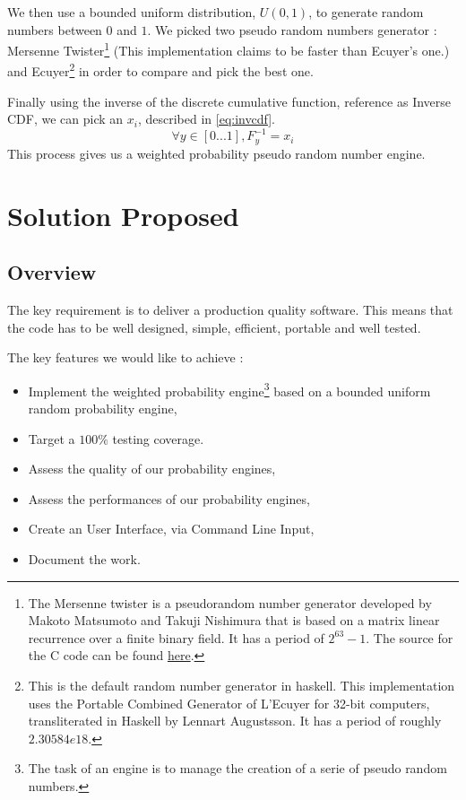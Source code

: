 \documentclass[12pt,a4paper,article]{memoir} %
\begin{document}
We then use a bounded uniform distribution, $U\left(0,1\right)$,
to generate random numbers between $0$ and $1$.
We picked two pseudo random numbers generator : Mersenne Twister\footnote{
The Mersenne twister is a pseudorandom number generator developed by 
Makoto Matsumoto and Takuji Nishimura that is based on a matrix linear 
recurrence over a finite binary field. 
It has a period of $2^{63}-1$.
The source for the C code can be found 
\href{http://www.math.sci.hiroshima-u.ac.jp/~m-mat/MT/emt64.html}{here}.
} (This implementation claims to be faster than Ecuyer's one.) and Ecuyer\footnote{
This is the default random number generator in haskell.
 This implementation uses the Portable Combined Generator of L'Ecuyer
 for 32-bit computers, transliterated in Haskell by Lennart Augustsson. 
 It has a period of roughly $2.30584e18$.
 } in order to compare and pick the best one.

Finally using the inverse of the discrete cumulative function, reference as Inverse CDF, 
we can pick an $x_i$, described in \autoref{eq:invcdf}.
\begin{equation}
	\forall y \in \left[0...1 \right], F^{-1}_y = x_i
	\label{eq:invcdf}
\end{equation}
This process gives us a weighted probability pseudo random number engine.

\section{Solution Proposed}
\subsection{Overview}

The key requirement is to deliver a production quality software.
This means that the code has to be well designed, simple, 
efficient, portable and well tested.

The key features we would like to achieve :
\begin{itemize}
	\item Implement the weighted probability engine\footnote{
		The task of an engine is to manage the creation of a serie of
		pseudo random numbers.} based
		on a bounded uniform random probability engine,
	\item Target a $100\%$ testing coverage.
	\item Assess the quality of our probability engines,
	\item Assess the performances of our probability engines,
	\item Create an User Interface, via Command Line Input,
	\item Document the work.
\end{itemize}
\end{document}
